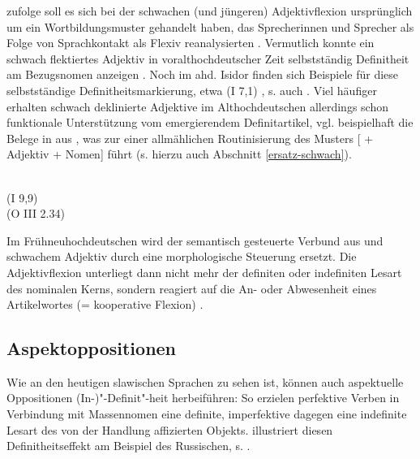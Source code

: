 \textcite[361ff.]{Braunmuller2008} zufolge soll es sich bei der schwachen (und jüngeren) Adjektivflexion ursprünglich um ein Wortbildungsmuster gehandelt haben, das Sprecherinnen und Sprecher als Folge von Sprachkontakt als Flexiv reanalysierten \parencite[zu alternativen Entstehungsszenarien s.][13--26]{Kovari1984}. Vermutlich konnte ein schwach flektiertes Adjektiv in voralthochdeutscher Zeit selbstständig Definitheit am Bezugsnomen anzeigen 
\parencites()()[69]{Demske2001}[364]{Braunmuller2008}. Noch im ahd. Isidor finden sich Beispiele für diese selbstständige Definitheitsmarkierung, etwa   (I 7,1) \parencite[226]{Braune2004}, s. auch \textcite[69f.]{Demske2001}. 
Viel häufiger erhalten schwach deklinierte Adjektive im Althochdeutschen allerdings schon funktionale Unterstützung vom emergierendem Definitartikel, vgl. beispielhaft die Belege in  aus \textcite[24,28]{Schrodt2004}, was zur einer allmählichen Routinisierung des Musters [ + Adjektiv + Nomen] führt (s. hierzu auch Abschnitt \ref{ersatz-schwach}).

\begin{exe}
	\ex \label{ex:art-adj}   
	\begin{xlist}
		\ex \label{ex:art-adj1}  \\    (I 9,9) 
		\ex \label{ex:art-adj2}   \\  (O III 2.34)
		\end{xlist}
\end{exe}
 
Im Frühneuhochdeutschen wird der semantisch gesteuerte Verbund aus  und schwachem Adjektiv durch eine morphologische Steuerung ersetzt. Die Adjektivflexion unterliegt dann nicht mehr der definiten oder indefiniten Lesart des nominalen Kerns, sondern reagiert auf die An- oder Abwesenheit eines Artikelwortes (= kooperative Flexion) \parencite[s. hierzu ausführlich][]{Demske2001,Szczepaniak2011a}. 

\subsection{Aspektoppositionen} \label{sec:aspektoppo}

Wie an den heutigen slawischen Sprachen zu sehen ist, können auch aspektuelle Oppositionen (In-)"-Definit"-heit herbeiführen: So erzielen perfektive Verben in Verbindung mit Massennomen eine definite, imperfektive dagegen eine indefinite Lesart des von der Handlung affizierten Objekts. \textcite[11ff.]{Leiss2000} illustriert diesen Definitheitseffekt am Beispiel des Russischen, s. .  

